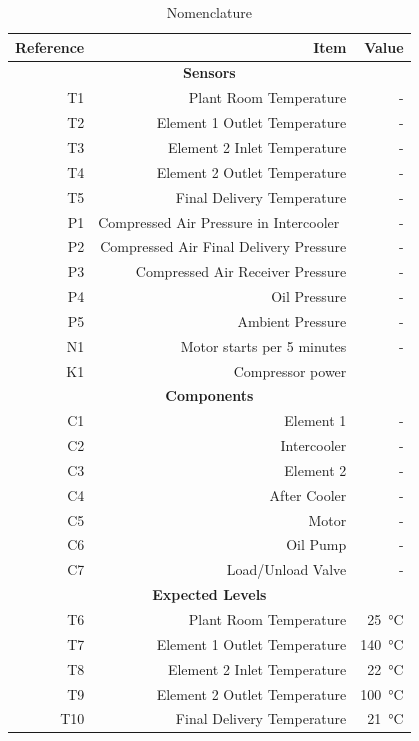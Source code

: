 \begin{table}[htbp]
  \centering
  \caption{Nomenclature}
    \begin{tabular}{rrr}
    \toprule
    \textbf{Reference} & \textbf{Item} & \textbf{Value} \\
    \midrule
    \multicolumn{3}{c}{\textbf{Sensors}} \\
    T1    & Plant Room Temperature & - \\
    T2    & Element 1 Outlet Temperature & - \\
    T3    & Element 2 Inlet Temperature & - \\
    T4    & Element 2 Outlet Temperature & - \\
    T5    & Final Delivery Temperature & - \\
    P1    & Compressed Air Pressure in Intercooler  & - \\
    P2    & Compressed Air Final Delivery Pressure & - \\
    P3    & Compressed Air Receiver Pressure & - \\
    P4    & Oil Pressure & - \\
    P5    & Ambient Pressure & - \\
    N1    & Motor starts per 5 minutes & - \\
    K1    & Compressor power &  \\
    \multicolumn{3}{c}{\textbf{Components}} \\
    C1    & Element 1 & - \\
    C2    & Intercooler & - \\
    C3    & Element 2 & - \\
    C4    & After Cooler & - \\
    C5    & Motor & - \\
    C6    & Oil Pump & - \\
    C7    & Load/Unload Valve & - \\
    \multicolumn{3}{c}{\textbf{Expected Levels}} \\
    T6    & Plant Room Temperature & \SI{25}{\degreeCelsius} \\
    T7    & Element 1 Outlet Temperature & \SI{140}{\degreeCelsius} \\
    T8    & Element 2 Inlet Temperature & \SI{22}{\degreeCelsius} \\
    T9    & Element 2 Outlet Temperature & \SI{100}{\degreeCelsius} \\
    T10   & Final Delivery Temperature & \SI{21}{\degreeCelsius} \\

\end{tabular}
\end{table}
